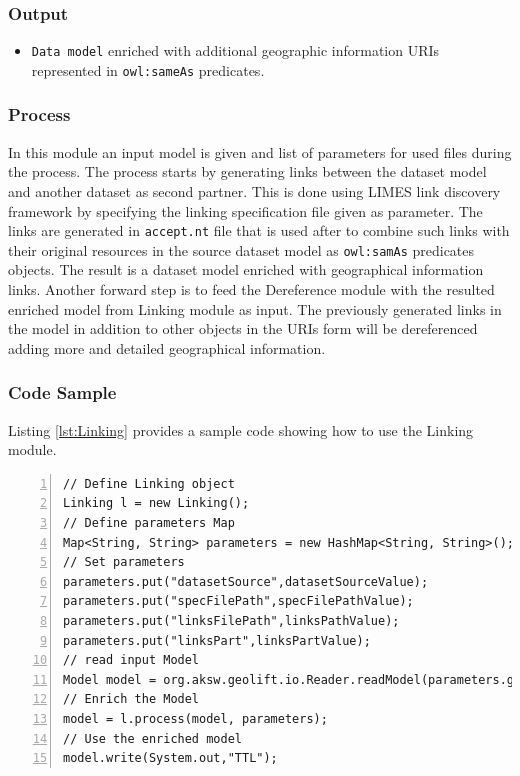 \documentclass[a4paper,twoside,bibtotoc,abstracton,12pt,BCOR=15mm]{article}
\begin{document}
\subsubsection{Output}
\begin{itemize}
 \item \texttt{Data model} enriched with additional geographic information URIs represented in \texttt{owl:sameAs} predicates.
\end{itemize}

\subsubsection{Process}
In this module an input model is given and list of parameters for used files during the process. The process starts by generating links between the dataset model and another dataset as second partner. 
This is done using LIMES link discovery framework by specifying the linking specification file given as parameter.
The links are generated in \texttt{accept.nt} file that is used after to combine such links with their original resources in the source dataset model as \texttt{owl:samAs} predicates objects. The result is a dataset model enriched with geographical information links. 
Another forward step is to feed the Dereference module with the resulted enriched model from Linking module as input. 
The previously generated links in the model in addition to other objects in the URIs form will be dereferenced adding more and detailed geographical information.
\subsubsection{Code Sample}
Listing \ref{lst:Linking} provides a sample code showing how to use the Linking module.
\begingroup
    \fontsize{8pt}{10pt}\selectfont
\begin{lstlisting}[label=lst:Linking, numbers=left, numberstyle=\tiny, caption = Code fragment to call the \texttt{Linking} class.]
// Define Linking object
Linking l = new Linking();
// Define parameters Map
Map<String, String> parameters = new HashMap<String, String>();
// Set parameters
parameters.put("datasetSource",datasetSourceValue);
parameters.put("specFilePath",specFilePathValue);
parameters.put("linksFilePath",linksPathValue);
parameters.put("linksPart",linksPartValue);
// read input Model
Model model = org.aksw.geolift.io.Reader.readModel(parameters.get("datasetSource"));
// Enrich the Model
model = l.process(model, parameters);
// Use the enriched model
model.write(System.out,"TTL");
\end{lstlisting}
\endgroup
\end{document}
